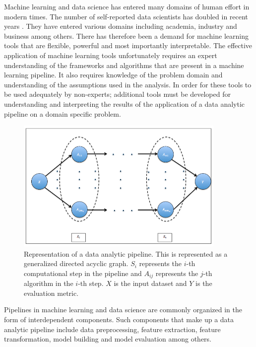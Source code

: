 Machine learning and data science has entered many domains of human effort in modern times. The number of self-reported data scientists has doubled in recent years \cite{harrison1995validity}. They have entered various domains including academia, industry and business among others. There has therefore been a demand for machine learning tools that are flexible, powerful and most importantly interpretable. The effective application of machine learning tools unfortunately requires an expert understanding of the frameworks and algorithms that are present in a machine learning pipeline. It also requires knowledge of the problem domain and understanding of the assumptions used in the analysis. In order for these tools to be used adequately by non-experts; additional tools must be developed for understanding and interpreting the results of the application of a data analytic pipeline on a domain specific problem.  
\begin{figure}[ht!]
    \centering
    \includegraphics[width=0.9\textwidth]{img/EP/generalized_pipeline}
    \caption{Representation of a data analytic pipeline. This is represented as a generalized directed acyclic graph. $S_i$ represents the $i$-th computational step in the pipeline and $A_{ij}$ represents the $j$-th algorithm in the $i$-th step. $X$ is the input dataset and $Y$ is the evaluation metric.}
    \label{fig:pipeline}
\end{figure}
Pipelines in machine learning and data science are commonly organized in the form of interdependent components. Such components that make up a data analytic pipeline include data preprocessing, feature extraction, feature transformation, model building and model evaluation among others. 
